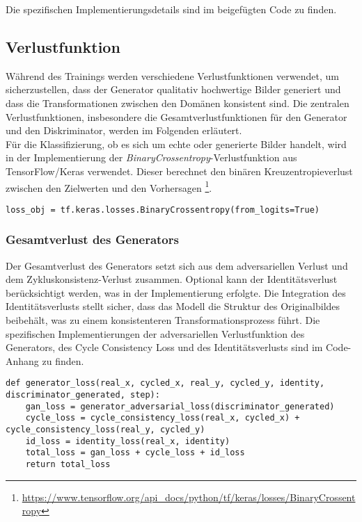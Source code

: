 Die spezifischen Implementierungsdetails sind im beigefügten Code zu finden.

\subsection{Verlustfunktion}
Während des Trainings werden verschiedene Verlustfunktionen verwendet, um sicherzustellen, dass der Generator qualitativ hochwertige Bilder generiert und dass die Transformationen zwischen den Domänen konsistent sind. Die zentralen Verlustfunktionen, insbesondere die Gesamtverlustfunktionen für den Generator und den Diskriminator, werden im Folgenden erläutert. 
\\
Für die Klassifizierung, ob es sich um echte oder generierte Bilder handelt, wird in der Implementierung der \textit{BinaryCrossentropy}-Verlustfunktion aus TensorFlow/Keras verwendet. Dieser  berechnet den binären Kreuzentropieverlust zwischen den Zielwerten und den Vorhersagen \footnote{\url{https://www.tensorflow.org/api_docs/python/tf/keras/losses/BinaryCrossentropy}}.

\begin{lstlisting}[language=pyhaff, caption={Vorverarbeitung des Datensatzes: Jittering}, label={cod:jittering}]
loss_obj = tf.keras.losses.BinaryCrossentropy(from_logits=True)
\end{lstlisting}


\subsubsection{Gesamtverlust des Generators}
Der Gesamtverlust des Generators setzt sich aus dem adversariellen Verlust und dem Zykluskonsistenz-Verlust zusammen. Optional kann der Identitätsverlust berücksichtigt werden, was in der Implementierung erfolgte. Die Integration des Identitätsverlusts stellt sicher, dass das Modell die Struktur des Originalbildes beibehält, was zu einem konsistenteren Transformationsprozess führt. Die spezifischen Implementierungen der adversariellen Verlustfunktion des Generators, des Cycle Consistency Loss und des Identitätsverlusts sind im Code-Anhang zu finden.
\begin{lstlisting}[language=pyhaff, caption={Vorverarbeitung des Datensatzes: Jittering}, label={cod:jittering}]
def generator_loss(real_x, cycled_x, real_y, cycled_y, identity, discriminator_generated, step):
    gan_loss = generator_adversarial_loss(discriminator_generated)
    cycle_loss = cycle_consistency_loss(real_x, cycled_x) + cycle_consistency_loss(real_y, cycled_y)
    id_loss = identity_loss(real_x, identity)
    total_loss = gan_loss + cycle_loss + id_loss
    return total_loss
\end{lstlisting}

